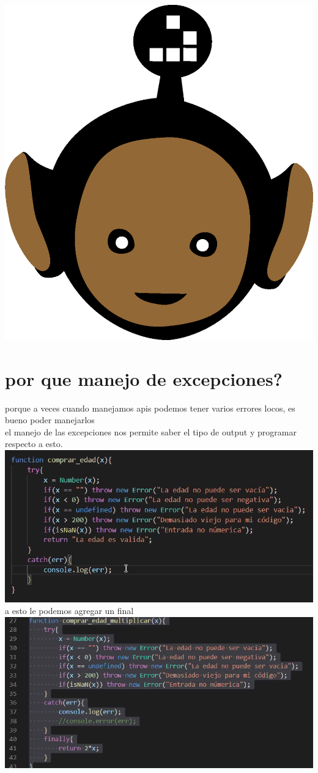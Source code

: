 \documentclass[10pt,a4paper]{article} %
\begin{document}
    \title{\rmfamily\normalfont{}}
    \author{}
    \date{\today}

    \maketitle


    \includegraphics[width=0.1\linewidth]{negro_cara.png}

    \section{por que manejo de excepciones?}
        porque a veces cuando manejamos apis podemos tener varios
        errores locos, es bueno poder manejarlos
        \\ el manejo de las excepciones nos permite saber el tipo de output y
        programar respecto a esto.
        \\\includegraphics[width=0.8\linewidth]{try_catch.png}
        \\a esto le podemos agregar un final
        \\ \includegraphics[width=0.8\linewidth]{erroresquedejanavanzar.png}
        \\
\end{document}
